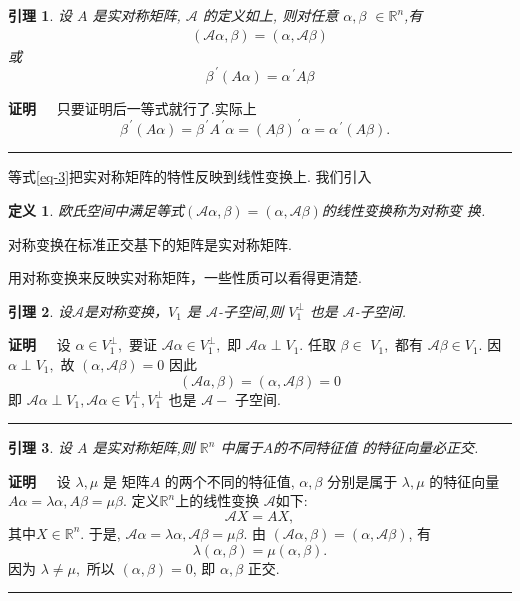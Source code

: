 \documentclass[13pt]{beamer}
\newtheorem{lem}{引理}
\newtheorem*{defi}{定义}
\def\qed{\nopagebreak\hfill{\rule{4pt}{7pt}}\medbreak}
\def\pf{{\bf 证明~~ }}
\def\R{\mathbb{R}}
\def\Rn{\mathbb{R}^n}
\def\A{\mathscr{A}}
\def\a{\alpha}
\begin{document}
\begin{frame}
\begin{lem}
设 $A$ 是实对称矩阵, $\A$ 的定义如上, 则对任意 ${\alpha}, {\beta}$ $\in {\R}^{n}$,有
\begin{align}\label{eq-3}
(\mathscr{A} {\a}, {\beta})=({\alpha}, \mathscr{A} {\beta})
\end{align}
或
\[
{\beta}^{\, \prime}({A} {\alpha})={\alpha}^{\, \prime} {A} {\beta}
\]
\end{lem}
\pf 只要证明后一等式就行了.实际上\\
$\qquad \qquad \qquad \qquad 
{\beta}^{\, \prime}({A} {\alpha})={\beta}^{\, \prime} {A}^{\, \prime} {\alpha}=({A} {\beta})^{\, \prime} {\alpha}={\alpha}^{\, \prime}({A} {\beta}).
$
\qed 
等式\eqref{eq-3}把实对称矩阵的特性反映到线性变换上. 我们引入
\begin{defi}
欧氏空间中满足等式$(\mathscr{A} {\a}, {\beta})=({\alpha}, \mathscr{A} {\beta})$的线性变换称为\alert{对称变
换}. 
\end{defi}
对称变换在标准正交基下的矩阵是实对称矩阵. 

用对称变换来反映实对称矩阵，一些性质可以看得更清楚.
\end{frame}


\begin{frame}
\begin{lem}
设$\mathscr{A}$是对称变换，$V_1$ 是 $\mathscr{A}$-子空间,则 $V_{1}^{\perp}$ 也是
$\mathscr{A}$-子空间. 
\end{lem}

\pf 
设 ${\a} \in V_{1}^{\perp},$ 要证 $\mathscr{A} {\alpha} \in V_{1}^{\perp},$ 即 $\mathscr{A} {\alpha} \perp V_{1} .$ 任取 ${\beta} \in$
$V_{1},$ 都有 $\mathscr{A} {\beta} \in V_{1} .$ 因 ${\alpha} \perp V_{1},$ 故 $({\alpha}, \mathscr{A} {\beta})=0$
因此
\[
(\mathscr{A} {a}, {\beta})=({\alpha}, \mathscr{A} {\beta})=0
\]
即 $\mathscr{A} {\alpha} \perp V_{1}, \mathscr{A} {\alpha} \in V_{1}^{\perp}, V_{1}^{\perp}$ 也是 $\mathscr{A}-$ 子空间.
\qed
\end{frame}

\begin{frame}
\begin{lem}
设 ${A} $ 是实对称矩阵,则 $\Rn$ 中属于${A} $的不同特征值 的特征向量必正交.
\end{lem}
\pf 
设 $\lambda, \mu$ 是 矩阵$A$ 的两个不同的特征值, ${\alpha}, {\beta}$ 分别是属于
$\lambda, \mu$ 的特征向量 $ A {\alpha}=\lambda {\alpha}, {A} {\beta}=\mu {\beta}$. 
定义$\Rn$上的线性变换 $\A$如下: $$\A X=AX,$$ 其中$X \in \Rn$. 
于是,
$\mathscr{A} {\alpha}=\lambda {\alpha}, \mathscr{A} {\beta}=\mu {\beta}$.
由 $(\mathscr{A} {\alpha}, {\beta})=({\alpha}, \mathscr{A} {\beta})$, 有
\[
\lambda({\alpha}, {\beta})=\mu({\alpha}, {\beta}).
\]
因为 $\lambda \neq \mu,$ 所以 $({\alpha}, {\beta})=0$, 即 ${\alpha}, {\beta}$ 正交.
\qed
\end{frame}
\end{document}

